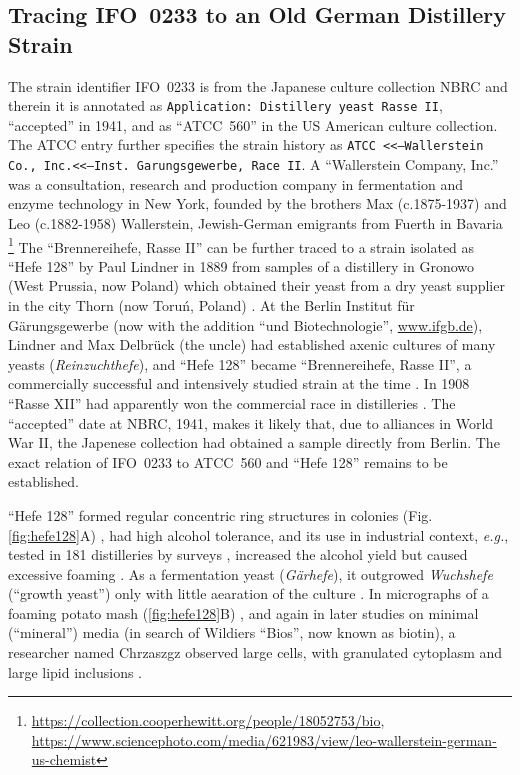 \documentclass[11pt,a4paper,english]{article}
\newcommand{\ifo}{IFO~0233}
\newcommand{\eg}[0]{\textit{e.g.}}
\let\cite\citep
\begin{document}
\subsection{Tracing \ifo{} to an Old German Distillery Strain}
The strain identifier \ifo{} is from the Japanese
culture collection NBRC and therein it is annotated as \texttt{Application:
  Distillery yeast Rasse II}, ``accepted'' in 1941, and as ``ATCC~560'' in
the US American culture collection. The ATCC entry further specifies
the strain history as \texttt{ATCC <<--Wallerstein Co.,
  Inc.<<--Inst. Garungsgewerbe, Race II}.  A ``Wallerstein Company,
Inc.''  was a consultation, research and production company in
fermentation and enzyme technology in New York, founded by the
brothers Max (c.1875-1937) and Leo (c.1882-1958) Wallerstein,
Jewish-German emigrants from Fuerth in
Bavaria \footnote{\url{https://collection.cooperhewitt.org/people/18052753/bio},\\ \url{https://www.sciencephoto.com/media/621983/view/leo-wallerstein-german-us-chemist}}
The ``Brennereihefe, Rasse II'' can be further traced to a strain
isolated as ``Hefe 128'' by Paul Lindner in 1889 from samples of a
distillery in Gronowo (West Prussia, now Poland) which obtained their
yeast from a dry yeast supplier in the city Thorn (now Toru\'n,
Poland) \cite{Lindner1895}. At the Berlin Institut f\"ur
G\"arungsgewerbe (now with the addition ``und Biotechnologie'',
\url{www.ifgb.de}), Lindner and Max Delbr\"uck (the uncle) had
established axenic cultures of many yeasts (\textit{Reinzuchthefe}),
and ``Hefe 128'' became ``Brennereihefe, Rasse II'', a commercially
successful and intensively studied strain at the time
\cite{Lindner1895, Lindner1919}. In 1908 ``Rasse XII'' had apparently
won the commercial race in distilleries \cite{Kohl1908}.  The
``accepted'' date at NBRC, 1941, makes it likely that, due to
alliances in World War II, the Japenese collection had obtained a
sample directly from Berlin. The exact relation of \ifo{} to ATCC~560
and ``Hefe 128'' remains to be established.

``Hefe 128'' formed regular concentric ring structures in colonies
(Fig. \ref{fig:hefe128}A) \cite{Lindner1895}, had high alcohol tolerance, and
its use in industrial context, \eg{}, tested in 181 distilleries by
surveys \cite{Dingler1894}, increased the alcohol yield but caused
excessive foaming \cite{Behrend1900}. As a fermentation yeast
(\textit{G\"arhefe}), it outgrowed \textit{Wuchshefe} (``growth
yeast'') only with little aearation of the culture \cite{Haehn1952}.
%
In micrographs of a foaming potato mash (\ref{fig:hefe128}B)
\cite{Lindner1903}, and again in later studies on minimal (``mineral'')
media (in search of Wildiers ``Bios'', now known as biotin), a
researcher named Chrzaszgz observed large cells, with granulated
cytoplasm and large lipid inclusions \cite{Lindner1919}.
%
%
\end{document}
